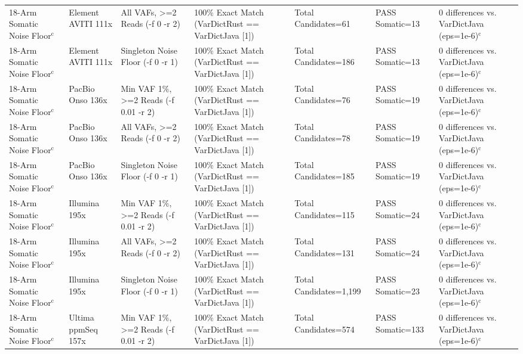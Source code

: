 \begin{table}[htbp]
{\begin{tabular}{lllllll}
18-Arm Somatic Noise Floor$^{\text{c}}$ & Element AVITI 111x & All VAFs, \textgreater{}=2 Reads (-f 0 -r 2) & 100\% Exact Match (VarDictRust == VarDictJava [1]) & Total Candidates=61 & PASS Somatic=13 & 0 differences vs. VarDictJava (eps=1e-6)$^{\text{c}}$ \\
18-Arm Somatic Noise Floor$^{\text{c}}$ & Element AVITI 111x & Singleton Noise Floor (-f 0 -r 1) & 100\% Exact Match (VarDictRust == VarDictJava [1]) & Total Candidates=186 & PASS Somatic=13 & 0 differences vs. VarDictJava (eps=1e-6)$^{\text{c}}$ \\
18-Arm Somatic Noise Floor$^{\text{c}}$ & PacBio Onso 136x & Min VAF 1\%, \textgreater{}=2 Reads (-f 0.01 -r 2) & 100\% Exact Match (VarDictRust == VarDictJava [1]) & Total Candidates=76 & PASS Somatic=19 & 0 differences vs. VarDictJava (eps=1e-6)$^{\text{c}}$ \\
18-Arm Somatic Noise Floor$^{\text{c}}$ & PacBio Onso 136x & All VAFs, \textgreater{}=2 Reads (-f 0 -r 2) & 100\% Exact Match (VarDictRust == VarDictJava [1]) & Total Candidates=78 & PASS Somatic=19 & 0 differences vs. VarDictJava (eps=1e-6)$^{\text{c}}$ \\
18-Arm Somatic Noise Floor$^{\text{c}}$ & PacBio Onso 136x & Singleton Noise Floor (-f 0 -r 1) & 100\% Exact Match (VarDictRust == VarDictJava [1]) & Total Candidates=185 & PASS Somatic=19 & 0 differences vs. VarDictJava (eps=1e-6)$^{\text{c}}$ \\
18-Arm Somatic Noise Floor$^{\text{c}}$ & Illumina 195x & Min VAF 1\%, \textgreater{}=2 Reads (-f 0.01 -r 2) & 100\% Exact Match (VarDictRust == VarDictJava [1]) & Total Candidates=115 & PASS Somatic=24 & 0 differences vs. VarDictJava (eps=1e-6)$^{\text{c}}$ \\
18-Arm Somatic Noise Floor$^{\text{c}}$ & Illumina 195x & All VAFs, \textgreater{}=2 Reads (-f 0 -r 2) & 100\% Exact Match (VarDictRust == VarDictJava [1]) & Total Candidates=131 & PASS Somatic=24 & 0 differences vs. VarDictJava (eps=1e-6)$^{\text{c}}$ \\
18-Arm Somatic Noise Floor$^{\text{c}}$ & Illumina 195x & Singleton Noise Floor (-f 0 -r 1) & 100\% Exact Match (VarDictRust == VarDictJava [1]) & Total Candidates=1,199 & PASS Somatic=23 & 0 differences vs. VarDictJava (eps=1e-6)$^{\text{c}}$ \\
18-Arm Somatic Noise Floor$^{\text{c}}$ & Ultima ppmSeq 157x & Min VAF 1\%, \textgreater{}=2 Reads (-f 0.01 -r 2) & 100\% Exact Match (VarDictRust == VarDictJava [1]) & Total Candidates=574 & PASS Somatic=133 & 0 differences vs. VarDictJava (eps=1e-6)$^{\text{c}}$ \\

\end{tabular}}
\end{table}
